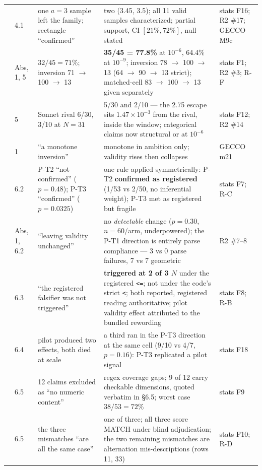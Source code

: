 \documentclass[11pt]{article}
\begin{document}
\begin{longtable}{L{4mm}L{10mm}L{41mm}L{64mm}L{18mm}}
 & 4.1 & one $a = 3$ sample left the family; rectangle ``confirmed'' & two (3.45, 3.5); all 11 valid samples characterized; partial support, CI $[21\%, 72\%]$, null stated & stats F16; R2 \#17; GECCO M9c \\
 & Abs, 1, 5 & $32/45 = 71\%$; inversion 71 $\rightarrow$ 100 $\rightarrow$ 13 & \textbf{35/45 = 77.8\%} at $10^{-6}$, 64.4\% at $10^{-9}$; inversion 78 $\rightarrow$ 100 $\rightarrow$ 13 (64 $\rightarrow$ 90 $\rightarrow$ 13 strict); matched-cell 83 $\rightarrow$ 100 $\rightarrow$ 13 given separately & stats F1; R2 \#3; R-F \\
 & 5 & Sonnet rival 6/30, 3/10 at $N = 31$ & 5/30 and 2/10 --- the 2.75 escape sits $1.47\times10^{-3}$ from the rival, inside the window; categorical claims now structural or at $10^{-6}$ & stats F12; R2 \#14 \\
 & 1 & ``a monotone inversion'' & monotone in ambition only; validity rises then collapses & GECCO m21 \\
 & 6.2 & P-T2 ``not confirmed'' ($p = 0.48$); P-T3 ``confirmed'' ($p = 0.0325$) & one rule applied symmetrically: P-T2 \textbf{confirmed as registered} (1/53 vs 2/50, no inferential weight); P-T3 met as registered but fragile & stats F7; R-C \\
 & Abs, 1, 6.2 & ``leaving validity unchanged'' & no \textit{detectable} change ($p = 0.30$, $n = 60$/arm, underpowered); the P-T1 direction is entirely parse compliance --- 3 vs 0 parse failures, 7 vs 7 geometric & R2 \#7--8 \\
 & 6.3 & ``the registered falsifier was not triggered'' & \textbf{triggered at 2 of 3 $N$} under the registered \texttt{<=}; not under the code's strict \texttt{<}; both reported, registered reading authoritative; pilot validity effect attributed to the bundled rewording & stats F8; R-B \\
 & 6.4 & pilot produced two effects, both died at scale & a third ran in the P-T3 direction at the same cell (9/10 vs 4/7, $p = 0.16$): P-T3 replicated a pilot signal & stats F18 \\
 & 6.5 & 12 claims excluded as ``no numeric content'' & regex coverage gaps; 9 of 12 carry checkable dimensions, quoted verbatim in \S6.5; worst case $38/53 = 72\%$ & stats F9 \\
 & 6.5 & the three mismatches ``are all the same case'' & one of three; all three score MATCH under blind adjudication; the two remaining mismatches are alternation mis-descriptions (rows 11, 33) & stats F10; R-D \\

\end{longtable}
\end{document}
